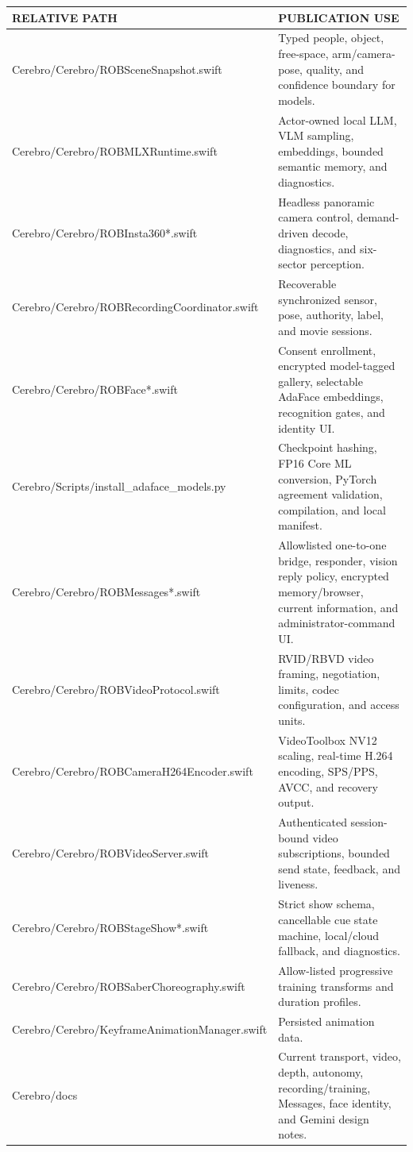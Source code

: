 \documentclass[10pt,openany]{book}
\begin{document}
\begin{tabularx}{\textwidth}{>{\ttfamily\scriptsize}p{2.65in} X}
\toprule
RELATIVE PATH & PUBLICATION USE\\
\midrule
Cerebro/Cerebro/ROBSceneSnapshot.swift & Typed people, object, free-space, arm/camera-pose, quality, and confidence boundary for models.\\
Cerebro/Cerebro/ROBMLXRuntime.swift & Actor-owned local LLM, VLM sampling, embeddings, bounded semantic memory, and diagnostics.\\
Cerebro/Cerebro/ROBInsta360*.swift & Headless panoramic camera control, demand-driven decode, diagnostics, and six-sector perception.\\
Cerebro/Cerebro/ROBRecordingCoordinator.swift & Recoverable synchronized sensor, pose, authority, label, and movie sessions.\\
Cerebro/Cerebro/ROBFace*.swift & Consent enrollment, encrypted model-tagged gallery, selectable AdaFace embeddings, recognition gates, and identity UI.\\
Cerebro/Scripts/install\_adaface\_models.py & Checkpoint hashing, FP16 Core ML conversion, PyTorch agreement validation, compilation, and local manifest.\\
Cerebro/Cerebro/ROBMessages*.swift & Allowlisted one-to-one bridge, responder, vision reply policy, encrypted memory/browser, current information, and administrator-command UI.\\
Cerebro/Cerebro/ROBVideoProtocol.swift & RVID/RBVD video framing, negotiation, limits, codec configuration, and access units.\\
Cerebro/Cerebro/ROBCameraH264Encoder.swift & VideoToolbox NV12 scaling, real-time H.264 encoding, SPS/PPS, AVCC, and recovery output.\\
Cerebro/Cerebro/ROBVideoServer.swift & Authenticated session-bound video subscriptions, bounded send state, feedback, and liveness.\\
Cerebro/Cerebro/ROBStageShow*.swift & Strict show schema, cancellable cue state machine, local/cloud fallback, and diagnostics.\\
Cerebro/Cerebro/ROBSaberChoreography.swift & Allow-listed progressive training transforms and duration profiles.\\
Cerebro/Cerebro/KeyframeAnimationManager.swift & Persisted animation data.\\
Cerebro/docs & Current transport, video, depth, autonomy, recording/training, Messages, face identity, and Gemini design notes.\\

\end{tabularx}
\end{document}
